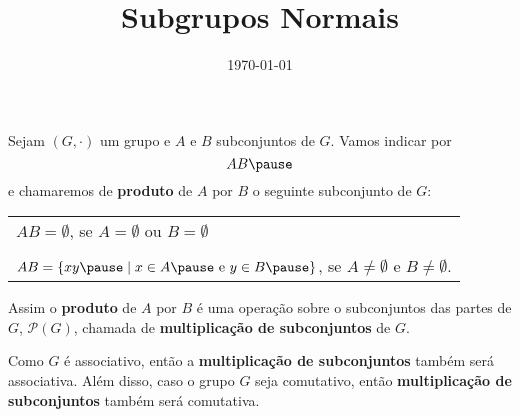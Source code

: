 \documentclass{beamer}
\title{Subgrupos Normais}
\author[\autor]{\autor}
\institute[\instituto]{\instituto}
\date{\today}
\begin{document}
    \begin{frame}
        \maketitle
    \end{frame}


    \begin{frame}
        Sejam $(G, \cdot)$ um grupo \pause e $A$ e $B$ subconjuntos de $G$. \pause Vamos indicar por \pause
        \[
            AB \pause
        \]
        e chamaremos de \textbf{produto} de $A$ por $B$ \pause o seguinte subconjunto de $G$: \pause
        \begin{center}
            \begin{tabular}{l}
                $AB = \emptyset$, \pause se $A = \emptyset$ ou $B = \emptyset$ \pause\\
                \\
                $AB = \{xy \pause \mid x \in A \pause \mbox{ e } y \in B \pause\}$, se  $A \ne \emptyset$ e $B \ne \emptyset$. \pause
            \end{tabular}
        \end{center}

        \vspace{.3cm}

        Assim o \textbf{produto} de $A$ por $B$ \pause é uma operação sobre o subconjuntos das partes de $G$, \pause $\mathcal{P}(G)$, chamada de \textbf{multiplicação de subconjuntos} de $G$. \pause

        \vspace{.3cm}

        Como $G$ é associativo, \pause então a \textbf{multiplicação de subconjuntos} também será associativa. \pause Além disso, caso o grupo $G$ seja comutativo, \pause então \textbf{multiplicação de subconjuntos} também será comutativa.
    \end{frame}
\end{document}
